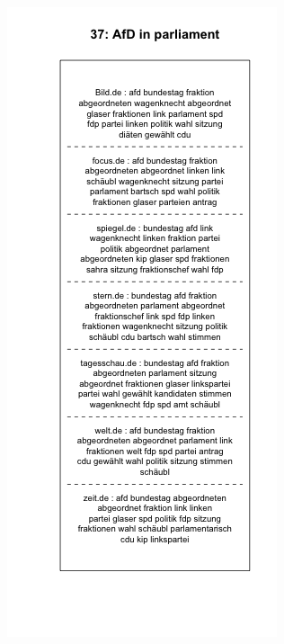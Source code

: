\documentclass[12pt,a4paper,notitlepage]{article}
\begin{document}
{%
\begin{figure}[H]
	\begin{center}
		\begin{subfigure}[normla]{0.49\textwidth}
			\includegraphics[width=\textwidth]{../figs/plotquote37.png}

\end{subfigure}
\end{center}
\end{figure}}
\end{document}
